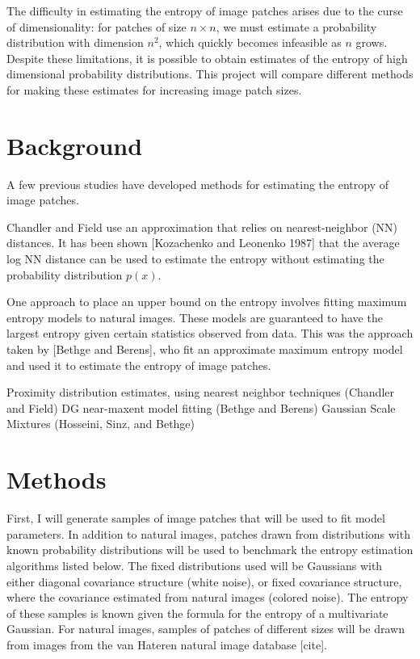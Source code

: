 \documentclass[10pt,twocolumn,letterpaper]{article}
\begin{document}
The difficulty in estimating the entropy of image patches arises due to the curse of dimensionality: for patches of size $n\times n$, we must estimate a probability distribution with dimension $n^2$, which quickly becomes infeasible as $n$ grows. Despite these limitations, it is possible to obtain estimates of the entropy of high dimensional probability distributions. This project will compare different methods for making these estimates for increasing image patch sizes.

\section{Background}
A few previous studies have developed methods for estimating the entropy of image patches.

Chandler and Field use an approximation that relies on nearest-neighbor (NN) distances. It has been shown [Kozachenko and Leonenko 1987] that the average log NN distance can be used to estimate the entropy without estimating the probability distribution $p(x)$.

One approach to place an upper bound on the entropy involves fitting maximum entropy models to natural images. These models are guaranteed to have the largest entropy given certain statistics observed from data. This was the approach taken by [Bethge and Berens], who fit an approximate maximum entropy model and used it to estimate the entropy of image patches.

Proximity distribution estimates, using nearest neighbor techniques (Chandler and Field)
DG near-maxent model fitting (Bethge and Berens)
Gaussian Scale Mixtures (Hosseini, Sinz, and Bethge)

\section{Methods}
First, I will generate samples of image patches that will be used to fit model parameters. In addition to natural images, patches drawn from distributions with known probability distributions will be used to benchmark the entropy estimation algorithms listed below. The fixed distributions used will be Gaussians with either diagonal covariance structure (white noise), or fixed covariance structure, where the covariance estimated from natural images (colored noise). The entropy of these samples is known given the formula for the entropy of a multivariate Gaussian. For natural images, samples of patches of different sizes will be drawn from images from the van Hateren natural image database [cite].
\end{document}
